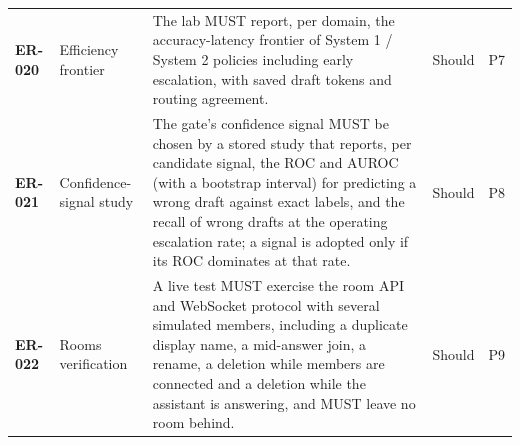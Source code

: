 \begin{longtable}{@{}p{1.45cm}p{2.5cm}p{8.1cm}p{1.6cm}p{1.1cm}@{}}
\textbf{ER-020} & Efficiency frontier & The lab MUST report, per domain, the accuracy-latency frontier of System 1 / System 2 policies including early escalation, with saved draft tokens and routing agreement. & Should & P7\\
\textbf{ER-021} & Confidence-signal study & The gate's confidence signal MUST be chosen by a stored study that reports, per candidate signal, the ROC and AUROC (with a bootstrap interval) for predicting a wrong draft against exact labels, and the recall of wrong drafts at the operating escalation rate; a signal is adopted only if its ROC dominates at that rate. & Should & P8\\
\textbf{ER-022} & Rooms verification & A live test MUST exercise the room API and WebSocket protocol with several simulated members, including a duplicate display name, a mid-answer join, a rename, a deletion while members are connected and a deletion while the assistant is answering, and MUST leave no room behind. & Should & P9\\
\end{longtable}

